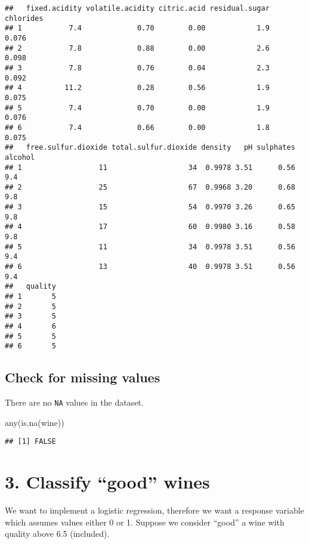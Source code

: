 \documentclass[
]{article}
\newenvironment{Shaded}{\begin{snugshade}}{\end{snugshade}}
\newcommand{\FunctionTok}[1]{\textcolor[rgb]{0.00,0.00,0.00}{#1}}
\newcommand{\NormalTok}[1]{#1}
\begin{document}
\begin{verbatim}
##   fixed.acidity volatile.acidity citric.acid residual.sugar chlorides
## 1           7.4             0.70        0.00            1.9     0.076
## 2           7.8             0.88        0.00            2.6     0.098
## 3           7.8             0.76        0.04            2.3     0.092
## 4          11.2             0.28        0.56            1.9     0.075
## 5           7.4             0.70        0.00            1.9     0.076
## 6           7.4             0.66        0.00            1.8     0.075
##   free.sulfur.dioxide total.sulfur.dioxide density   pH sulphates alcohol
## 1                  11                   34  0.9978 3.51      0.56     9.4
## 2                  25                   67  0.9968 3.20      0.68     9.8
## 3                  15                   54  0.9970 3.26      0.65     9.8
## 4                  17                   60  0.9980 3.16      0.58     9.8
## 5                  11                   34  0.9978 3.51      0.56     9.4
## 6                  13                   40  0.9978 3.51      0.56     9.4
##   quality
## 1       5
## 2       5
## 3       5
## 4       6
## 5       5
## 6       5
\end{verbatim}

\hypertarget{check-for-missing-values}{%
\subsection{Check for missing values}\label{check-for-missing-values}}

There are no \texttt{NA} values in the dataset.

\begin{Shaded}
\begin{Highlighting}[]
\FunctionTok{any}\NormalTok{(}\FunctionTok{is.na}\NormalTok{(wine))}
\end{Highlighting}
\end{Shaded}

\begin{verbatim}
## [1] FALSE
\end{verbatim}

\hypertarget{classify-good-wines}{%
\section{3. Classify ``good'' wines}\label{classify-good-wines}}

We want to implement a logistic regression, therefore we want a response
variable which assumes values either 0 or 1. Suppose we consider
``good'' a wine with quality above 6.5 (included).
\end{document}
